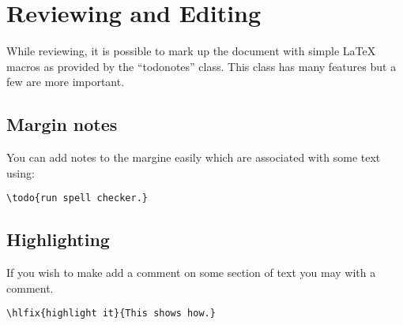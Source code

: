 \chapter{Reviewing and Editing}


While reviewing, it is possible to mark up the document with simple
\LaTeX{} macros as provided by the ``todonotes'' class.
This class has many features but a few are more important.


\section{Margin notes}

You can add notes to the margine easily which
are associated with some text using:

\begin{verbatim}
\todo{run spell checker.}
\end{verbatim}

\section{Highlighting}

If you wish to make add a comment on some section of text you may
with a comment.


\begin{verbatim}
\hlfix{highlight it}{This shows how.}
\end{verbatim}

